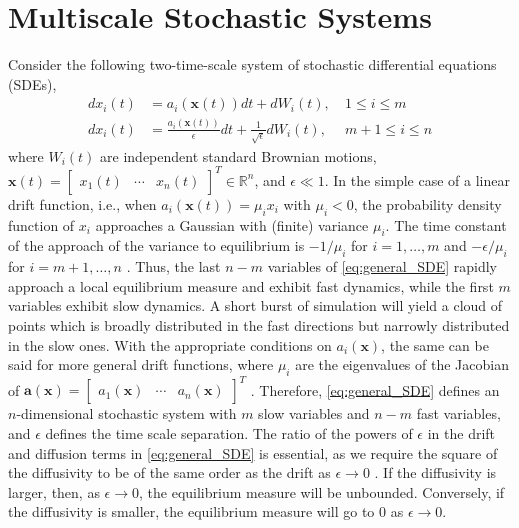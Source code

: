 \section{Multiscale Stochastic Systems} \label{subsec:multiscale_SDE}

Consider the following two-time-scale system of stochastic differential equations (SDEs),
\begin{equation} \label{eq:general_SDE}
\begin{aligned}
dx_i(t) &= a_i(\mathbf{x}(t)) dt + dW_i(t), & \: 1 \le i \le m \\
dx_i(t) &= \frac{a_i(\mathbf{x}(t))}{\epsilon} dt + \frac{1}{\sqrt{\epsilon}} dW_i(t) , & \: m+1 \le i \le n
\end{aligned}
\end{equation}
where $W_i(t)$ are independent standard Brownian motions, $\mathbf{x}(t)  = \begin{bmatrix} x_1(t) & \cdots & x_n(t) \end{bmatrix}^T \in \mathbb{R}^n$, and $\epsilon \ll 1$.
%
In the simple case of a linear drift function, i.e., when $a_i(\mathbf{x}(t)) = \mu _i x_i$ with $\mu_i < 0$, the probability density function of $x_i$ approaches a Gaussian with
(finite) variance $\mu_i$.
%
The time constant of the approach of the variance to equilibrium is $-1/\mu_i$ for $i=1,\ldots,m$ and $-\epsilon/\mu_i$ for $i=m+1,\ldots,n$ \cite{lelievre2013optimal}.
%
Thus, the last $n-m$ variables of \eqref{eq:general_SDE} rapidly approach a local equilibrium measure and exhibit fast dynamics, while the first $m$ variables exhibit slow dynamics.
%
A short burst of simulation will yield a cloud of points which is broadly distributed in the fast directions but narrowly distributed in the slow ones.
%
With the appropriate conditions on $a_i(\mathbf{x})$, the same can be said for more general drift
functions, where $\mu_i$ are the eigenvalues of the Jacobian of $\mathbf{a}(\mathbf{x}) = \begin{bmatrix} a_1(\mathbf{x}) & \cdots & a_n(\mathbf{x}) \end{bmatrix}^T$ \cite{villani2009hypocoercivity}.
%
Therefore, \eqref{eq:general_SDE} defines an $n$-dimensional stochastic system with $m$ slow
variables and $n-m$ fast variables, and $\epsilon$ defines the time scale separation.
%
The ratio of the powers of $\epsilon$ in the drift and diffusion terms in \eqref{eq:general_SDE} is essential,
as we require the square of the diffusivity to be of the same order as the drift as $\epsilon \rightarrow 0$ \cite{berglund2003geometric}.
%
If the diffusivity is larger, then, as $\epsilon \rightarrow 0$, the equilibrium measure will be
unbounded.
%
Conversely, if the diffusivity is smaller, the equilibrium measure will go to $0$ as $\epsilon \rightarrow 0$.

